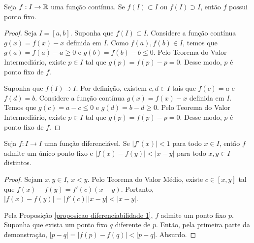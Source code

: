 


\begin{proposition}
\label{proposicao diferenciabilidade 1}
Seja $f: I \to \mathbb{R}$ uma função contínua. Se $f(I) \subset I$ ou $f(I) \supset I$, então $f$ possui ponto fixo.
\end{proposition}

\begin{proof}
Seja $I = [a, b]$. Suponha que $f(I) \subset I$. Considere a função contínua $g(x) = f(x) - x$ definida em $I$. Como $f(a), f(b) \in I$, temos que $g(a) = f(a) - a \geq 0$ e $g(b) = f(b) - b \leq 0$. Pelo Teorema do Valor Intermediário, existe $p \in I$ tal que $g(p) = f(p) -p = 0$. Desse modo, $p$ é ponto fixo de $f$.

Suponha que $f(I) \supset I$. Por definição, existem $c, d \in I$ tais que $f(c) = a$ e$f(d) = b$. Considere a função contínua $g(x) = f(x) - x$ definida em $I$. Temos que $g(c) = a - c \leq 0$ e $g(d) = b - d \geq 0$. Pelo Teorema do Valor Intermediário, existe $p \in I$ tal que $g(p) = f(p) - p = 0$. Desse modo, $p$ é ponto fixo de $f$.
\end{proof}

\begin{theorem}
Seja $f:I \to I$ uma função diferenciável. Se $|f'(x)|<1$ para todo $x \in I$, então $f$ admite um único ponto fixo e $|f(x) - f(y)| < |x - y|$ para todo $x, y \in I$ distintos.
\end{theorem}

\begin{proof}
Sejam $x, y \in I$, $x < y$. Pelo Teorema do Valor Médio, existe $c \in [x, y]$ tal que $f(x) - f(y) = f'(c)(x - y)$. Portanto, $|f(x) - f(y)| = |f'(c)||x - y| < |x - y|$.

Pela Proposição \ref{proposicao diferenciabilidade 1}, $f$ admite um ponto fixo $p$. Suponha que exista um ponto fixo $q$ diferente de $p$. Então, pela primeira parte da demonstração, $|p - q| = |f(p) - f(q)| < |p - q|$. Absurdo.
\end{proof}


